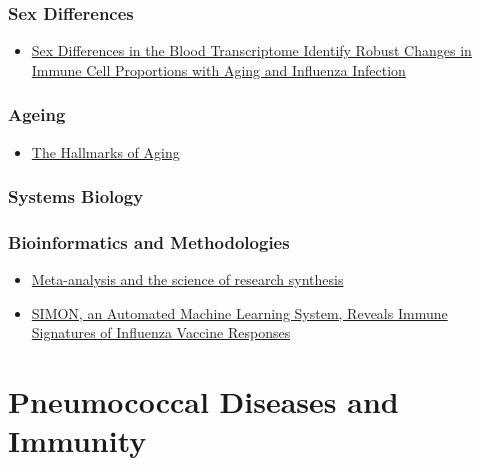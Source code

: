 \documentclass[
]{book}
\providecommand{\tightlist}{%
  \setlength{\itemsep}{0pt}\setlength{\parskip}{0pt}}
\begin{document}
\hypertarget{sex-differences}{%
\subsection{Sex Differences}\label{sex-differences}}

\begin{itemize}
\tightlist
\item
  \href{https://www.sciencedirect.com/science/article/pii/S2211124719313191}{Sex Differences in the Blood Transcriptome Identify Robust Changes in Immune Cell Proportions with Aging and Influenza Infection}
\end{itemize}

\hypertarget{ageing}{%
\subsection{Ageing}\label{ageing}}

\begin{itemize}
\tightlist
\item
  \href{https://www.cell.com/fulltext/S0092-8674(13)00645-4}{The Hallmarks of Aging}
\end{itemize}

\hypertarget{systems-biology}{%
\subsection{Systems Biology}\label{systems-biology}}

\hypertarget{bioinformatics-and-methodologies}{%
\subsection{Bioinformatics and Methodologies}\label{bioinformatics-and-methodologies}}

\begin{itemize}
\tightlist
\item
  \href{https://www.nature.com/articles/nature25753}{Meta-analysis and the science of research synthesis}
\end{itemize}

\begin{itemize}
\tightlist
\item
  \href{https://pubmed.ncbi.nlm.nih.gov/31201239/}{SIMON, an Automated Machine Learning System, Reveals Immune Signatures of Influenza Vaccine Responses}
\end{itemize}

\hypertarget{pneumococcal-diseases-and-immunity}{%
\chapter{Pneumococcal Diseases and Immunity}\label{pneumococcal-diseases-and-immunity}}
\end{document}
